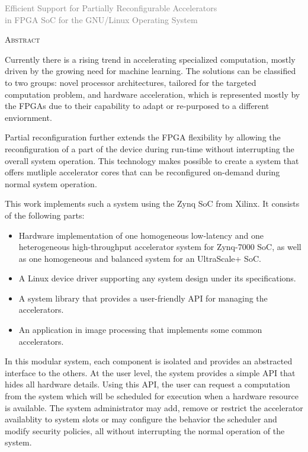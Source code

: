 \cleardoublepage
\rm
\begin{center}
	\textcolor{gray} {\Large
		Efficient Support for Partially Reconfigurable Accelerators\\
		in FPGA SoC for the GNU/Linux Operating System\\
	}

	\vspace{20pt}
	\textsc{\large Abstract}\\
	\vspace{0pt}
\end{center}

Currently there is a rising trend in accelerating specialized computation,
mostly driven by the growing need for machine learning. 
The solutions can be classified to two groups: 
novel processor architectures, tailored for the targeted computation problem,
and hardware acceleration, which is represented mostly by the FPGAs due
to their capability to adapt or re-purposed to a different enviornment.

Partial reconfiguration further extends the FPGA flexibility
by allowing the reconfiguration of a part of the device
during run-time without interrupting the overall system operation.
This technology makes possible to create a system that offers mutliple accelerator cores
that can be reconfigured on-demand during normal system operation.

This work implements such a system using the Zynq SoC from Xilinx. It consists of the following parts:

\begin{itemize}
\item	Hardware implementation of one homogeneous low-latency
	and one heterogeneous high-throughput 
	accelerator system for Zynq-7000 SoC,
	as well as one homogeneous and balanced system for an UltraScale+ SoC.
\item	A Linux device driver supporting any system design under its specifications.
\item	A system library that provides a user-friendly API for managing the accelerators.
\item	An application in image processing that implements some common accelerators.
\end{itemize}

In this modular system, each component is isolated and provides an abstracted interface to the others. 
At the user level, the system provides a simple API that hides all hardware details.
Using this API, the user can request a computation from the system which will be scheduled for execution
when a hardware resource is available.
The system administrator may add, remove or restrict the accelerator availablity to system slots or
may configure the behavior the scheduler and modify security policies, 
all without interrupting the normal operation of the system.

